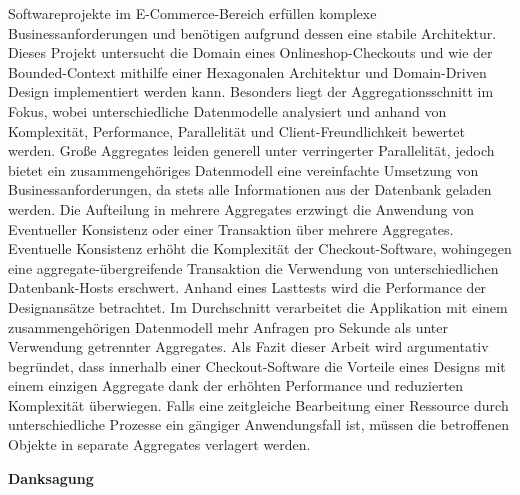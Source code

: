 {{		Softwareprojekte im E-Commerce-Bereich erfüllen komplexe Businessanforderungen und benötigen aufgrund dessen eine stabile Architektur. Dieses Projekt untersucht die Domain eines Onlineshop-Checkouts und wie der Bounded-Context mithilfe einer Hexagonalen Architektur und Domain-Driven Design implementiert werden kann. Besonders liegt der Aggregationsschnitt im Fokus, wobei unterschiedliche Datenmodelle analysiert und anhand von Komplexität, Performance, Parallelität und Client-Freundlichkeit bewertet werden. Große Aggregates leiden generell unter verringerter Parallelität, jedoch bietet ein zusammengehöriges Datenmodell eine vereinfachte Umsetzung von Businessanforderungen, da stets alle Informationen aus der Datenbank geladen werden. Die Aufteilung in mehrere Aggregates erzwingt die Anwendung von Eventueller Konsistenz oder einer Transaktion über mehrere Aggregates. Eventuelle Konsistenz erhöht die Komplexität der Checkout-Software, wohingegen eine aggregate-übergreifende Transaktion die Verwendung von unterschiedlichen Datenbank-Hosts erschwert. Anhand eines Lasttests wird die Performance der Designansätze betrachtet. Im Durchschnitt verarbeitet die Applikation mit einem zusammengehörigen Datenmodell mehr Anfragen pro Sekunde als unter Verwendung getrennter Aggregates. Als Fazit dieser Arbeit wird argumentativ begründet, dass innerhalb einer Checkout-Software die Vorteile eines Designs mit einem einzigen Aggregate dank der erhöhten Performance und reduzierten Komplexität überwiegen. Falls eine zeitgleiche Bearbeitung einer Ressource durch unterschiedliche Prozesse ein gängiger Anwendungsfall ist, müssen die betroffenen Objekte in separate Aggregates verlagert werden.
		  
	\par}
	\pagebreak

	\vspace{0.9cm}
	\large
	\textbf{Danksagung}
	
	\pagebreak
	
\par}
